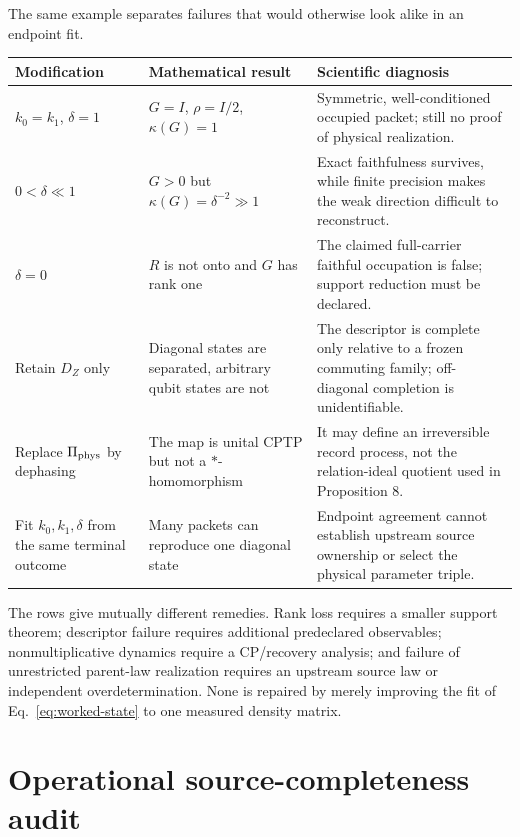 \documentclass[11pt]{article}
\begin{document}
The same example separates failures that would otherwise look alike in an
endpoint fit.
\begin{longtable}{p{.22\linewidth}p{.28\linewidth}p{.38\linewidth}}
\toprule
Modification & Mathematical result & Scientific diagnosis\\
\midrule
\endhead
\(k_0=k_1\), \(\delta=1\) & \(G=I\),
\(\rho=I/2\), \(\kappa(G)=1\) & Symmetric, well-conditioned occupied packet;
still no proof of physical realization.\\
\(0<\delta\ll1\) & \(G>0\) but
\(\kappa(G)=\delta^{-2}\gg1\) & Exact faithfulness survives, while finite
precision makes the weak direction difficult to reconstruct.\\
\(\delta=0\) & \(R\) is not onto and \(G\) has rank one & The claimed
full-carrier faithful occupation is false; support reduction must be declared.\\
Retain \(D_Z\) only & Diagonal states are separated, arbitrary qubit states
are not & The descriptor is complete only relative to a frozen commuting
family; off-diagonal completion is unidentifiable.\\
Replace \(\Pi_{\rm phys}\) by dephasing & The map is unital CPTP but not a
\(*\)-homomorphism & It may define an irreversible record process, not the
relation-ideal quotient used in Proposition 8.\\
Fit \(k_0,k_1,\delta\) from the same terminal outcome & Many packets can
reproduce one diagonal state & Endpoint agreement cannot establish upstream
source ownership or select the physical parameter triple.\\
\bottomrule
\end{longtable}

The rows give mutually different remedies.  Rank loss requires a smaller
support theorem; descriptor failure requires additional predeclared
observables; nonmultiplicative dynamics require a CP/recovery analysis; and
failure of unrestricted parent-law realization requires an upstream source
law or independent
overdetermination.  None is repaired by merely improving the fit of
Eq.~\eqref{eq:worked-state} to one measured density matrix.

\section{Operational source-completeness audit}
\end{document}
